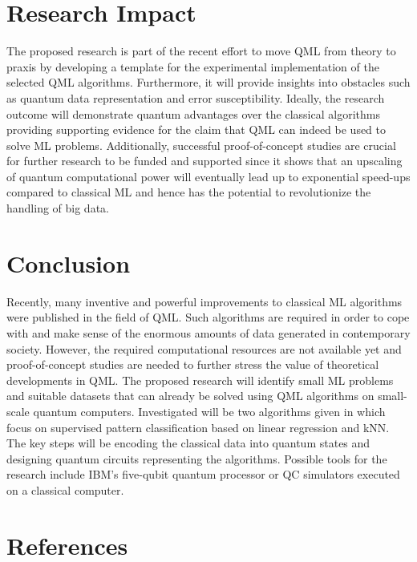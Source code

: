 \documentclass[a4paper]{article}
\newcommand*{\0}{$\ket{0}$}
\newcommand*{\1}{$\ket{1}$}
\begin{document}
\section{Research Impact}
\label{sec:research impact}
The proposed research is part of the recent effort to move QML from theory to praxis by developing a template for the experimental implementation of the selected QML algorithms. Furthermore, it will provide insights into obstacles such as quantum data representation and error susceptibility. Ideally, the research outcome will demonstrate quantum advantages over the classical algorithms providing supporting evidence for the claim that QML can indeed be used to solve ML problems. Additionally, successful proof-of-concept studies are crucial for further research to be funded and supported since it shows that an upscaling of quantum computational power will eventually lead up to exponential speed-ups compared to classical ML and hence has the potential to revolutionize the handling of big data.

\section{Conclusion}
\label{sec:conclusion}
Recently, many inventive and powerful improvements to classical ML algorithms were published in the field of QML. Such algorithms are required in order to cope with and make sense of the enormous amounts of data generated in contemporary society. However, the required computational resources are not available yet and proof-of-concept studies are needed to further stress the value of theoretical developments in QML. The proposed research will identify small ML problems and suitable datasets that can already be solved using QML algorithms on small-scale quantum computers. Investigated will be two algorithms given in \cite{Schuld2014, Schuld2016} which focus on supervised pattern classification based on linear regression and kNN. The key steps will be encoding the classical data into quantum states and designing quantum circuits representing the algorithms. Possible tools for the research include IBM's five-qubit quantum processor or QC simulators executed on a classical computer.

\section{References}
\begingroup
\renewcommand{\section}[2]{}%


\endgroup


\end{document}

